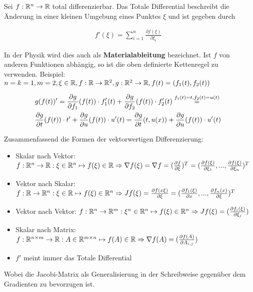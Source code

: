 \begin{definition}
	Sei $f : \mathbb{R}^n \rightarrow \mathbb{R}$ total differenzierbar. Das Totale Differential beschreibt die Änderung in einer kleinen Umgebung eines Punktes $\xi$ und ist gegeben durch
	
	\begin{align*}
		 f'(\xi) = \sum_{i = 1}^{n} \frac{\partial f (\xi) }{\partial \xi_i} 
	\end{align*}
	
	In der Physik wird dies auch als \textbf{Materialableitung} bezeichnet. Ist $f$ von anderen Funktionen abhängig, so ist die oben definierte Kettenregel zu verwenden. Beispiel: $n=k=1, m=2, \xi \in \mathbb{R}, f : \mathbb{R} \rightarrow \mathbb{R}^2, g : \mathbb{R}^2 \rightarrow \mathbb{R}, f(t) = (f_1(t), f_2(t)) $
	
	\begin{align*}
		&g(f(t))' = \frac{\partial g}{\partial f_1}(f(t)) \cdot f_1'(t) + \frac{\partial g}{\partial f_2}(f(t)) \cdot f_2'(t) \overset{f_1(t) = t, f_2(t) = u(t)}{=} \\
		 &\frac{\partial g}{\partial t}(f(t)) \cdot t' + \frac{\partial g}{\partial u}(f(t)) \cdot u'(t) = \frac{\partial g}{\partial t}(t, u(x))  + \frac{\partial g}{\partial u}(f(t)) \cdot u'(t)
	\end{align*}
	
\end{definition}


\begin{definition}
	Zusammenfassend die Formen der vektorwertigen Differenzierung:
	\begin{itemize}[noitemsep]
		\item Skalar nach Vektor: $f : \mathbb{R}^n \rightarrow \mathbb{R} : \xi \in \mathbb{R}^n \mapsto f(\xi) \in \mathbb{R} \Rightarrow \nabla f(\xi) = \nabla f = (\frac{\partial f}{\partial \xi})^T = (\frac{\partial f(\xi)}{\partial \xi_1}, ..., \frac{\partial f(\xi)}{\partial \xi_n})^T$
		\item Vektor nach Skalar: $f : \mathbb{R} \rightarrow \mathbb{R}^n : \xi \in \mathbb{R} \mapsto f(\xi) \in \mathbb{R}^n \Rightarrow Jf(\xi) = \frac{\partial  f(x\xi)}{\partial \xi} = (\frac{\partial f_1(\xi)}{\partial x}, ..., \frac{\partial f_n(x)}{\partial \xi})^T$  
		\item Vektor nach Vektor:  $f : \mathbb{R}^n \rightarrow \mathbb{R}^m : \xi^n \in \mathbb{R}^n \mapsto f(\xi) \in \mathbb{R}^n \Rightarrow Jf (\xi) = (\frac{\partial f_{i}(\xi)}{\partial \xi_j})$
		\item Skalar nach Matrix: $f : \mathbb{R}^{n \times m} \rightarrow \mathbb{R} : A \in \mathbb{R}^{m \times n} \mapsto f(A) \in \mathbb{R} \Rightarrow \nabla f(A) = (\frac{\partial f(A)}{\partial A_{i, j}})$   
		\item  $f'$ meint immer das Totale Differential
	\end{itemize}
	Wobei die Jacobi-Matrix als Generalisierung in der Schreibweise gegenüber dem Gradienten zu bevorzugen ist.
\end{definition}


